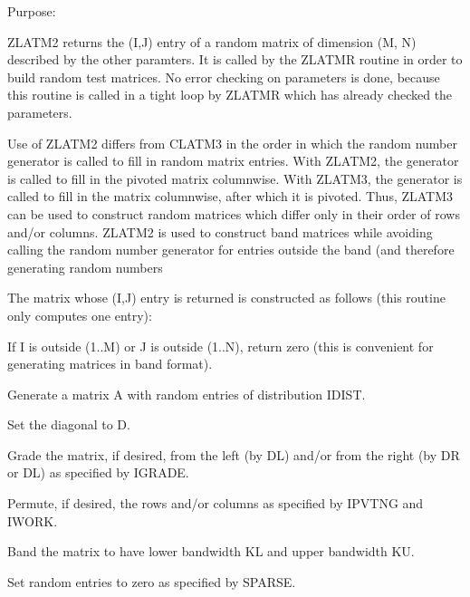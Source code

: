 \begin{DoxyParagraph}{Purpose\+: }
\begin{DoxyVerb}    ZLATM2 returns the (I,J) entry of a random matrix of dimension
    (M, N) described by the other paramters. It is called by the
    ZLATMR routine in order to build random test matrices. No error
    checking on parameters is done, because this routine is called in
    a tight loop by ZLATMR which has already checked the parameters.

    Use of ZLATM2 differs from CLATM3 in the order in which the random
    number generator is called to fill in random matrix entries.
    With ZLATM2, the generator is called to fill in the pivoted matrix
    columnwise. With ZLATM3, the generator is called to fill in the
    matrix columnwise, after which it is pivoted. Thus, ZLATM3 can
    be used to construct random matrices which differ only in their
    order of rows and/or columns. ZLATM2 is used to construct band
    matrices while avoiding calling the random number generator for
    entries outside the band (and therefore generating random numbers

    The matrix whose (I,J) entry is returned is constructed as
    follows (this routine only computes one entry):

      If I is outside (1..M) or J is outside (1..N), return zero
         (this is convenient for generating matrices in band format).

      Generate a matrix A with random entries of distribution IDIST.

      Set the diagonal to D.

      Grade the matrix, if desired, from the left (by DL) and/or
         from the right (by DR or DL) as specified by IGRADE.

      Permute, if desired, the rows and/or columns as specified by
         IPVTNG and IWORK.

      Band the matrix to have lower bandwidth KL and upper
         bandwidth KU.

      Set random entries to zero as specified by SPARSE.\end{DoxyVerb}
 
\end{DoxyParagraph}

